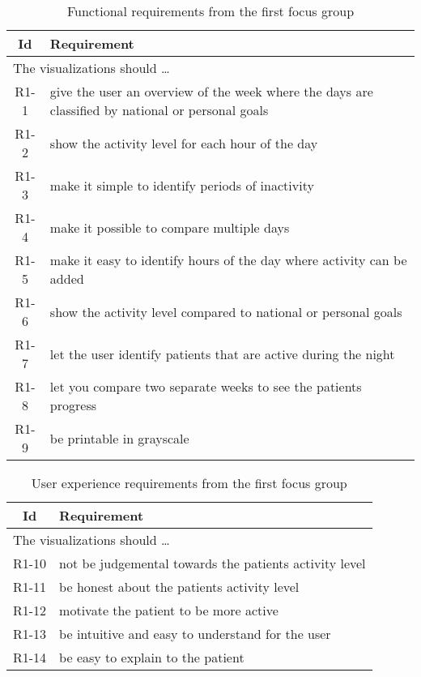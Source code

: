 \begin{table}[h!]
  \begin{center}
  \begin{tabular}{|c|p{12cm}|}
    \hline
      \textbf{Id} & \textbf{Requirement} \\ \hline
    \multicolumn{2}{|l|}{The visualizations should \ldots} \\ \hline
      R1-1 & give the user an overview of the week where the days are classified by national or personal goals \\ \hline
      R1-2 & show the activity level for each hour of the day \\ \hline
      R1-3 & make it simple to identify periods of inactivity \\ \hline
      R1-4 & make it possible to compare multiple days \\ \hline
      R1-5 & make it easy to identify hours of the day where activity can be added \\ \hline
      R1-6 & show the activity level compared to national or personal goals \\ \hline
      R1-7 & let the user identify patients that are active during the night \\ \hline
      R1-8 & let you compare two separate weeks to see the patients progress \\ \hline
      R1-9 & be printable in grayscale \\ \hline
  \end{tabular}
  \end{center}
  \caption{Functional requirements from the first focus group}
\end{table}

\begin{table}[h!]
  \begin{center}
  \begin{tabular}{|c|p{12cm}|}
    \hline
      \textbf{Id} & \textbf{Requirement} \\ \hline
    \multicolumn{2}{|l|}{The visualizations should \ldots} \\ \hline
      R1-10 & not be judgemental towards the patients activity level \\ \hline
      R1-11 & be honest about the patients activity level \\ \hline
      R1-12 & motivate the patient to be more active \\ \hline
      R1-13 & be intuitive and easy to understand for the user \\ \hline
      R1-14 & be easy to explain to the patient \\ \hline
  \end{tabular}
  \end{center}
  \caption{User experience requirements from the first focus group}
\end{table}
